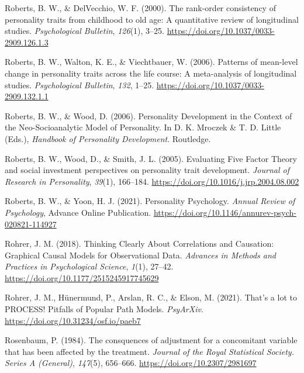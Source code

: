 \documentclass[
  english,
  man,floatsintext]{apa7}
\begin{document}
\leavevmode\hypertarget{ref-robertsRankorderConsistencyPersonality2000}{}%
Roberts, B. W., \& DelVecchio, W. F. (2000). The rank-order consistency of personality traits from childhood to old age: A quantitative review of longitudinal studies. \emph{Psychological Bulletin}, \emph{126}(1), 3--25. \url{https://doi.org/10.1037/0033-2909.126.1.3}

\leavevmode\hypertarget{ref-robertsPatternsMeanlevelChange2006a}{}%
Roberts, B. W., Walton, K. E., \& Viechtbauer, W. (2006). Patterns of mean-level change in personality traits across the life course: A meta-analysis of longitudinal studies. \emph{Psychological Bulletin}, \emph{132}, 1--25. \url{https://doi.org/10.1037/0033-2909.132.1.1}

\leavevmode\hypertarget{ref-robertsPersonalityDevelopmentContext2006}{}%
Roberts, B. W., \& Wood, D. (2006). Personality Development in the Context of the Neo-Socioanalytic Model of Personality. In D. K. Mroczek \& T. D. Little (Eds.), \emph{Handbook of Personality Development}. Routledge.

\leavevmode\hypertarget{ref-robertsEvaluatingFiveFactor2005}{}%
Roberts, B. W., Wood, D., \& Smith, J. L. (2005). Evaluating Five Factor Theory and social investment perspectives on personality trait development. \emph{Journal of Research in Personality}, \emph{39}(1), 166--184. \url{https://doi.org/10.1016/j.jrp.2004.08.002}

\leavevmode\hypertarget{ref-robertsPersonalityPsychology2021}{}%
Roberts, B. W., \& Yoon, H. J. (2021). Personality Psychology. \emph{Annual Review of Psychology}, Advance Online Publication. \url{https://doi.org/10.1146/annurev-psych-020821-114927}

\leavevmode\hypertarget{ref-rohrerThinkingClearlyCorrelations2018}{}%
Rohrer, J. M. (2018). Thinking Clearly About Correlations and Causation: Graphical Causal Models for Observational Data. \emph{Advances in Methods and Practices in Psychological Science}, \emph{1}(1), 27--42. \url{https://doi.org/10.1177/2515245917745629}

\leavevmode\hypertarget{ref-rohrerThatLotPROCESS2021}{}%
Rohrer, J. M., Hünermund, P., Arslan, R. C., \& Elson, M. (2021). That's a lot to PROCESS! Pitfalls of Popular Path Models. \emph{PsyArXiv}. \url{https://doi.org/10.31234/osf.io/paeb7}

\leavevmode\hypertarget{ref-rosenbaumConsquencesAdjustmentConcomitant1984}{}%
Rosenbaum, P. (1984). The consquences of adjustment for a concomitant variable that has been affected by the treatment. \emph{Journal of the Royal Statistical Society. Series A (General)}, \emph{147}(5), 656--666. \url{https://doi.org/10.2307/2981697}
\end{document}
